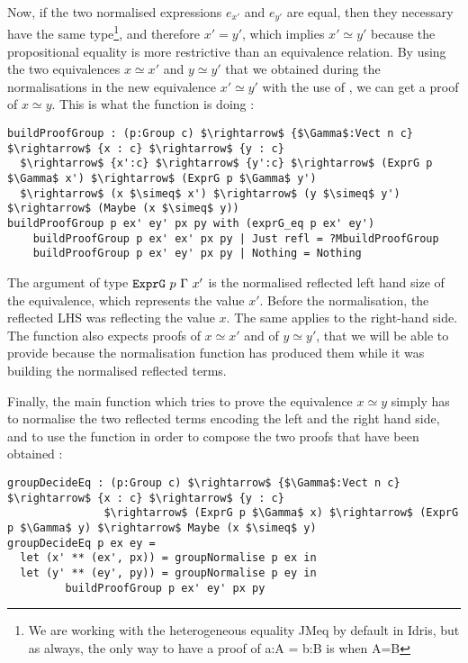 Now, if the two normalised expressions $e_{x'}$ and $e_{y'}$ are equal, then they necessary have the same type\footnote{We are working with the heterogeneous equality JMeq by default in Idris, but as always, the only way to have a proof of a:A = b:B is when A=B}, and therefore $x'=y'$, which implies $x' \simeq y'$ because the propositional equality is more restrictive than an equivalence relation.
By using the two equivalences $x \simeq x'$ and $y \simeq y'$ that we obtained during the normalisations in the new equivalence $x' \simeq y'$ with the use of , we can get a proof of $x \simeq y$. This is what the function  is doing :

\begin{lstlisting}
buildProofGroup : (p:Group c) $\rightarrow$ {$\Gamma$:Vect n c} $\rightarrow$ {x : c} $\rightarrow$ {y : c} 
  $\rightarrow$ {x':c} $\rightarrow$ {y':c} $\rightarrow$ (ExprG p $\Gamma$ x') $\rightarrow$ (ExprG p $\Gamma$ y') 
  $\rightarrow$ (x $\simeq$ x') $\rightarrow$ (y $\simeq$ y') $\rightarrow$ (Maybe (x $\simeq$ y))
buildProofGroup p ex' ey' px py with (exprG_eq p ex' ey')
    buildProofGroup p ex' ex' px py | Just refl = ?MbuildProofGroup
    buildProofGroup p ex' ey' px py | Nothing = Nothing
\end{lstlisting}

The argument of type $\code{ExprG}\ p\ \Gamma\ x'$ is the normalised reflected left hand size of the equivalence, which represents the value $x'$. Before the normalisation, the reflected LHS was reflecting the value $x$. The same applies to the right-hand side. The function also expects proofs of $x \simeq x'$ and of $y \simeq y'$, that we will be able to provide because the normalisation function has produced them while it was building the normalised reflected terms.


Finally, the main function which tries to prove the equivalence $x \simeq y$ simply has to normalise the two reflected terms encoding the left and the right hand side, and to use the function  in order to compose the two proofs that have been obtained :

\begin{lstlisting}
groupDecideEq : (p:Group c) $\rightarrow$ {$\Gamma$:Vect n c} $\rightarrow$ {x : c} $\rightarrow$ {y : c} 
               $\rightarrow$ (ExprG p $\Gamma$ x) $\rightarrow$ (ExprG p $\Gamma$ y) $\rightarrow$ Maybe (x $\simeq$ y)
groupDecideEq p ex ey =
  let (x' ** (ex', px)) = groupNormalise p ex in
  let (y' ** (ey', py)) = groupNormalise p ey in
	     buildProofGroup p ex' ey' px py
\end{lstlisting}


